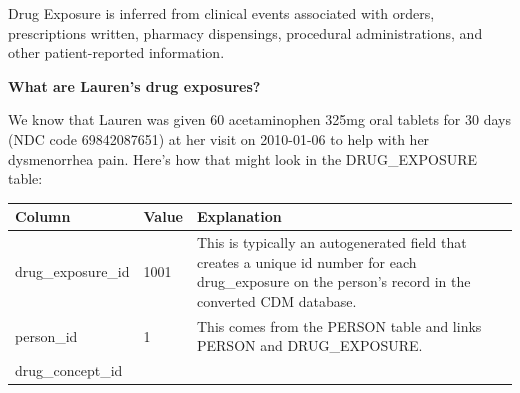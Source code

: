\documentclass[]{book}
\begin{document}
Drug Exposure is inferred from clinical events associated with orders,
prescriptions written, pharmacy dispensings, procedural administrations,
and other patient-reported information.

\textbf{What are Lauren's drug exposures?}

We know that Lauren was given 60 acetaminophen 325mg oral tablets for 30
days (NDC code 69842087651) at her visit on 2010-01-06 to help with her
dysmenorrhea pain. Here's how that might look in the DRUG\_EXPOSURE
table:

\begin{longtable}[]{@{}lll@{}}
\toprule
\begin{minipage}[b]{0.30\columnwidth}\raggedright\strut
Column\strut
\end{minipage} & \begin{minipage}[b]{0.14\columnwidth}\raggedright\strut
Value\strut
\end{minipage} & \begin{minipage}[b]{0.47\columnwidth}\raggedright\strut
Explanation\strut
\end{minipage}\tabularnewline
\midrule
\endhead
\begin{minipage}[t]{0.30\columnwidth}\raggedright\strut
drug\_exposure\_id\strut
\end{minipage} & \begin{minipage}[t]{0.14\columnwidth}\raggedright\strut
1001\strut
\end{minipage} & \begin{minipage}[t]{0.47\columnwidth}\raggedright\strut
This is typically an autogenerated field that creates a unique id number
for each drug\_exposure on the person's record in the converted CDM
database.\strut
\end{minipage}\tabularnewline
\begin{minipage}[t]{0.30\columnwidth}\raggedright\strut
person\_id\strut
\end{minipage} & \begin{minipage}[t]{0.14\columnwidth}\raggedright\strut
1\strut
\end{minipage} & \begin{minipage}[t]{0.47\columnwidth}\raggedright\strut
This comes from the PERSON table and links PERSON and
DRUG\_EXPOSURE.\strut
\end{minipage}\tabularnewline
\begin{minipage}[t]{0.30\columnwidth}\raggedright\strut
drug\_concept\_id\strut
\end{minipage} & \begin{minipage}[t]{0.14\columnwidth}\raggedright\strut

\end{minipage}
\end{longtable}
\end{document}
